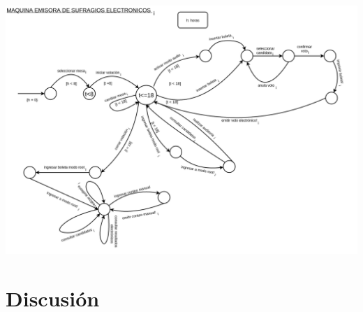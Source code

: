 \documentclass[spanish, 10pt,a4paper]{article}
\numberwithin{equation}{section} %
\begin{document}
\vspace{\baselineskip}
    \begin{center}
                \includegraphics[scale=0.35]{imagenes/fsm/FSMmaquinaEmisoraDeSufragios.png}
                \\
                \vspace{1pt}
                \footnotesize\textit{}
        \end{center}
\vspace{\baselineskip}

\section{Discusión}
\end{document}
